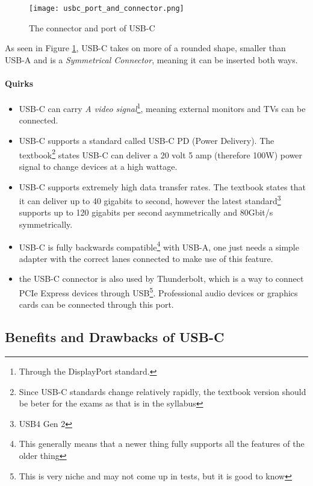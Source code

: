 \documentclass[../main.tex]{subfiles}
\begin{document}
\begin{figure}[h]
    \centering
    \texttt{[image: usbc\_port\_and\_connector.png]}
    \caption{The connector and port of USB-C}
    \label{fig:usbc_port_and_connector}
\end{figure}

As seen in Figure \ref{fig:usbc_port_and_connector}, USB-C takes on more of a rounded shape, smaller than USB-A and is a \emph{Symmetrical Connector}, meaning it can be inserted both ways.

\newpage

\paragraph{Quirks}

\begin{itemize}
    \item USB-C can carry \emph{A video signal}\footnote{Through the DisplayPort standard.}, meaning external monitors and TVs can be connected.
    \item USB-C supports a standard called USB-C PD (Power Delivery). The textbook\footnote{Since USB-C standards change relatively rapidly,
          the textbook version should be beter for the exams as that is in the syllabus} states USB-C can deliver a 20 volt 5 amp
          (therefore 100W) power signal to change devices at a high wattage.
    \item USB-C supports extremely high data transfer rates. The textbook states that it can deliver up to 40 gigabits to second, however the latest standard\footnote{USB4 Gen 2} supports up to 120 gigabits per second asymmetrically and 80Gbit/s symmetrically.
    \item USB-C is fully backwards compatible\footnote{This generally means that a newer thing fully supports all the features of the older thing} with USB-A, one just needs a simple adapter with the correct lanes connected to make use of this feature.
    \item the USB-C connector is also used by Thunderbolt, which is a way to connect PCIe Express devices through USB\footnote{This is very niche and may not come up in tests, but it is good to know}. Professional audio devices or graphics cards can be connected through this port.
\end{itemize}

\subsection{Benefits and Drawbacks of USB-C}
\end{document}
